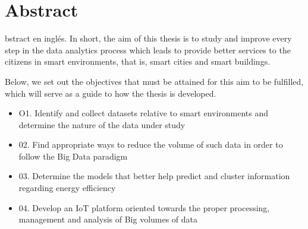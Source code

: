 %
%
\let\textcircled=\pgftextcircled
{}
\chapter{Abstract}
\label{chap:abs}

bstract en inglés. In short, the aim of this thesis is to study and improve every step in the data analytics process which leads to provide better services to the citizens in smart environments, that is, smart cities and smart buildings.

Below, we set out the objectives that must be attained for this aim to be fulfilled, which will serve as a guide to how the thesis is developed.

\begin{itemize}

\item O1. Identify and collect datasets relative to smart environments and determine the nature of the data under study
\item 02. Find appropriate ways to reduce the volume of such data in order to follow the Big Data paradigm
\item 03. Determine the models that better help predict and cluster information regarding energy efficiency
\item 04. Develop an IoT platform oriented towards the proper processing, management and analysis of Big volumes of data 

\end{itemize}